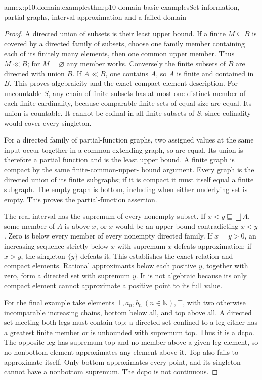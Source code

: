 \begin{annexitem}{annex:p10.domain.examples}{thm:p10-domain-basic-examples}{Set information, partial graphs, interval approximation and a failed domain}
\begin{proof}
A directed union of subsets is their least upper bound. If a finite
\(M\subseteq B\) is covered by a directed family of subsets, choose
one family member containing each of its finitely many elements, then
one common upper member. Thus \(M\ll B\); for \(M=\varnothing\)
any member works. Conversely the finite subsets of \(B\) are directed
with union \(B\). If \(A\ll B\), one contains \(A\), so \(A\)
is finite and contained in \(B\). This proves algebraicity and the
exact compact-element description. For uncountable \(S\), any chain
of finite subsets has at most one distinct member of each finite
cardinality, because comparable finite sets of equal size are equal.
Its union is countable. It cannot be cofinal in all finite subsets
of \(S\), since cofinality would cover every singleton.

For a directed family of partial-function graphs, two assigned values
at the same input occur together in a common extending graph, so are
equal. Its union is therefore a partial function and is the least
upper bound. A finite graph is compact by the same finite-common-upper-
bound argument. Every graph is the directed union of its finite
subgraphs; if it is compact it must itself equal a finite subgraph.
The empty graph is bottom, including when either underlying set is
empty. This proves the partial-function assertion.

The real interval has the supremum of every nonempty subset. If
\(x<y\sqsubseteq\bigsqcup A\), some member of \(A\) is above
\(x\), or \(x\) would be an upper bound contradicting \(x<y\).
Zero is below every member of every nonempty directed family.
If \(x=y>0\), an increasing sequence strictly below \(x\) with
supremum \(x\) defeats approximation; if \(x>y\), the singleton
\(\{y\}\) defeats it. This establishes the exact relation and
compact elements. Rational approximants below each positive \(y\),
together with zero, form a directed set with supremum \(y\).
It is not algebraic because its only compact element cannot
approximate a positive point to its full value.

For the final example take elements \(\bot,a_n,b_n\ (n\in\mathbb N),\top\),
with two otherwise incomparable increasing chains, bottom below all,
and top above all. A directed set meeting both legs must contain top;
a directed set confined to a leg either has a greatest finite member
or is unbounded with supremum top. Thus it is a dcpo. The opposite
leg has supremum top and no member above a given leg element, so no
nonbottom element approximates any element above it. Top also fails
to approximate itself. Only bottom approximates every point, and
its singleton cannot have a nonbottom supremum. The dcpo is not
continuous.
\end{proof}
\end{annexitem}

